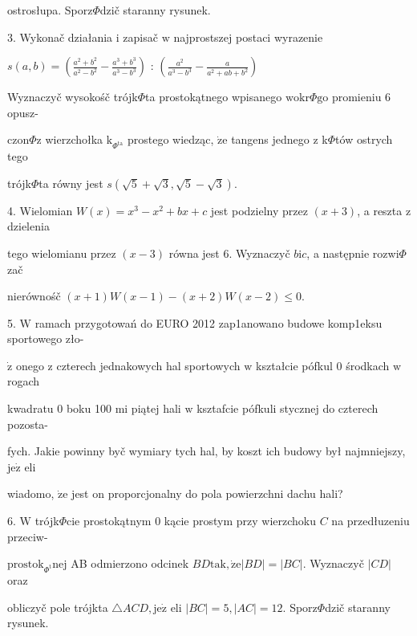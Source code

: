 \documentclass[a4paper,12pt]{article}
\begin{document}
ostrosłupa. Sporz$\Phi$dzič staranny rysunek.

3. Wykonač działania $\mathrm{i}$ zapisač $\mathrm{w}$ najprostszej postaci wyrazenie

$s(a,b)= (\displaystyle \frac{a^{2}+b^{2}}{a^{2}-b^{2}}-\frac{a^{3}+b^{3}}{a^{3}-b^{3}})$ : $(\displaystyle \frac{a^{2}}{a^{3}-b^{3}}-\frac{a}{a^{2}+ab+b^{2}})$

Wyznaczyč wysokośč trójk$\Phi$ta prostokątnego wpisanego $\mathrm{w}\mathrm{o}\mathrm{k}\mathrm{r}\Phi \mathrm{g}\mathrm{o}$ promieniu 6 opusz-

$\mathrm{c}\mathrm{z}\mathrm{o}\mathrm{n}\Phi \mathrm{z}$ wierzchołka $\mathrm{k}_{\Phi^{\mathrm{t}\mathrm{a}}}$ prostego wiedząc, $\dot{\mathrm{z}}\mathrm{e}$ tangens jednego $\mathrm{z}$ k$\Phi$tów ostrych tego

trójk$\Phi$ta równy jest $s(\sqrt{5}+\sqrt{3},\sqrt{5}-\sqrt{3}).$

4. Wielomian $W(x) =x^{3}-x^{2}+bx+c$ jest podzielny przez $(x+3)$, a reszta $\mathrm{z}$ dzielenia

tego wielomianu przez $(x-3)$ równa jest 6. Wyznaczyč $b\mathrm{i} c$, a następnie rozwi$\Phi$zač

nierównośč $(x+1)W(x-1)-(x+2)W(x-2)\leq 0.$

5. $\mathrm{W}$ ramach przygotowań do EURO 2012 zap1anowano budowe komp1eksu sportowego zło-

$\dot{\mathrm{z}}$ onego $\mathrm{z}$ czterech jednakowych hal sportowych $\mathrm{w}$ kształcie pófkul $0$ środkach $\mathrm{w}$ rogach

kwadratu $0$ boku 100 $\mathrm{m}\mathrm{i}$ piątej hali $\mathrm{w}$ ksztafcie pófkuli stycznej do czterech pozosta-

fych. Jakie powinny byč wymiary tych hal, by koszt ich budowy był najmniejszy, $\mathrm{j}\mathrm{e}\dot{\mathrm{z}}$ eli

wiadomo, $\dot{\mathrm{z}}\mathrm{e}$ jest on proporcjonalny do pola powierzchni dachu hali?

6. $\mathrm{W}$ trójk$\Phi$cie prostokątnym $0$ kącie prostym przy wierzchoku $C$ na przedłuzeniu przeciw-

$\mathrm{p}\mathrm{r}\mathrm{o}\mathrm{s}\mathrm{t}\mathrm{o}\mathrm{k}_{\Phi^{\mathrm{t}}}\mathrm{n}\mathrm{e}\mathrm{j}$ AB odmierzono odcinek $BD\mathrm{t}\mathrm{a}\mathrm{k}, \dot{\mathrm{z}}\mathrm{e}|BD|=|BC|$. Wyznaczyč $|CD|$ oraz

obliczyč pole trójkta $\triangle ACD, \mathrm{j}\mathrm{e}\dot{\mathrm{z}}$ eli $|BC|=5, |AC|=12$. Sporz$\Phi$dzič staranny rysunek.
\end{document}
